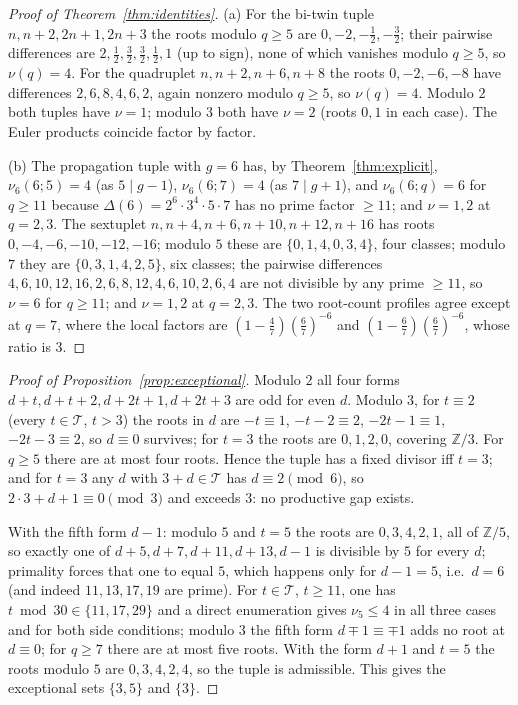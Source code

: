 \documentclass[11pt,a4paper]{article}
\theoremstyle{plain}
\theoremstyle{definition}
\theoremstyle{remark}
\newcommand{\Tset}{\mathcal{T}}
\newcommand{\Z}{\mathbb{Z}}
\begin{document}
\begin{proof}[Proof of Theorem~\ref{thm:identities}]
(a) For the bi-twin tuple $n,n+2,2n+1,2n+3$ the roots modulo $q\ge5$ are
$0,-2,-\frac12,-\frac32$; their pairwise differences are
$2,\frac12,\frac32,\frac32,\frac12,1$ (up to sign), none of which vanishes
modulo $q\ge5$, so $\nu(q)=4$.  For the quadruplet $n,n+2,n+6,n+8$ the
roots $0,-2,-6,-8$ have differences $2,6,8,4,6,2$, again nonzero modulo
$q\ge5$, so $\nu(q)=4$.  Modulo $2$ both tuples have $\nu=1$; modulo $3$
both have $\nu=2$ (roots $0,1$ in each case).  The Euler products
coincide factor by factor.

(b) The propagation tuple with $g=6$ has, by Theorem~\ref{thm:explicit},
$\nu_6(6;5)=4$ (as $5\mid g-1$), $\nu_6(6;7)=4$ (as $7\mid g+1$), and
$\nu_6(6;q)=6$ for $q\ge11$ because $\Delta(6)=2^{6}\cdot3^{4}\cdot5\cdot7$
has no prime factor $\ge11$; and $\nu=1,2$ at $q=2,3$.  The sextuplet
$n,n+4,n+6,n+10,n+12,n+16$ has roots $0,-4,-6,-10,-12,-16$; modulo $5$
these are $\{0,1,4,0,3,4\}$, four classes; modulo $7$ they are
$\{0,3,1,4,2,5\}$, six classes; the pairwise differences
$4,6,10,12,16,2,6,8,12,4,6,10,2,6,4$ are not divisible by any prime
$\ge11$, so $\nu=6$ for $q\ge11$; and $\nu=1,2$ at $q=2,3$.  The two
root-count profiles agree except at $q=7$, where the local factors are
$(1-\frac47)(\frac67)^{-6}$ and $(1-\frac67)(\frac67)^{-6}$, whose ratio is
$3$.
\end{proof}

\begin{proof}[Proof of Proposition~\ref{prop:exceptional}]
Modulo $2$ all four forms $d+t,d+t+2,d+2t+1,d+2t+3$ are odd for even $d$.
Modulo $3$, for $t\equiv2$ (every $t\in\Tset$, $t>3$) the roots in $d$ are
$-t\equiv1$, $-t-2\equiv2$, $-2t-1\equiv1$, $-2t-3\equiv2$, so $d\equiv0$
survives; for $t=3$ the roots are $0,1,2,0$, covering $\Z/3$.  For $q\ge5$
there are at most four roots.  Hence the tuple has a fixed divisor iff
$t=3$; and for $t=3$ any $d$ with $3+d\in\Tset$ has $d\equiv2\pmod6$, so
$2\cdot3+d+1\equiv0\pmod 3$ and exceeds $3$: no productive gap exists.

With the fifth form $d-1$: modulo $5$ and $t=5$ the roots are
$0,3,4,2,1$, all of $\Z/5$, so exactly one of $d+5,d+7,d+11,d+13,d-1$ is
divisible by $5$ for every $d$; primality forces that one to equal $5$,
which happens only for $d-1=5$, i.e.\ $d=6$ (and indeed
$11,13,17,19$ are prime).  For $t\in\Tset$, $t\ge11$, one has
$t\bmod30\in\{11,17,29\}$ and a direct enumeration gives $\nu_5\le4$ in
all three cases and for both side conditions; modulo $3$ the fifth form
$d\mp1\equiv\mp1$ adds no root at $d\equiv0$; for $q\ge7$ there are at most
five roots.  With the form $d+1$ and $t=5$ the roots modulo $5$ are
$0,3,4,2,4$, so the tuple is admissible.  This gives the exceptional sets
$\{3,5\}$ and $\{3\}$.
\end{proof}
\end{document}
